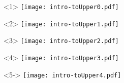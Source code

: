 \documentclass[UKenglish,usenames,dvipsnames,svgnames,table,aspectratio=169,mathserif]{beamer}
\begin{document}
\begin{frame}[fragile]
\centering

\begin{columns}
\begin{column}{0.5\textwidth}
\begin{overlayarea}{0.5\textwidth}{0.4\textheight}
\begin{onlyenv}<1>
\texttt{[image: intro-toUpper0.pdf]}
\end{onlyenv}
\begin{onlyenv}<2>
\texttt{[image: intro-toUpper1.pdf]}
\end{onlyenv}
\begin{onlyenv}<3>
\texttt{[image: intro-toUpper2.pdf]}
\end{onlyenv}
\begin{onlyenv}<4>
\texttt{[image: intro-toUpper3.pdf]}
\end{onlyenv}
\begin{onlyenv}<5->
\texttt{[image: intro-toUpper4.pdf]}
\end{onlyenv}
\end{overlayarea}
\end{column}


\end{columns}
\end{frame}
\end{document}
